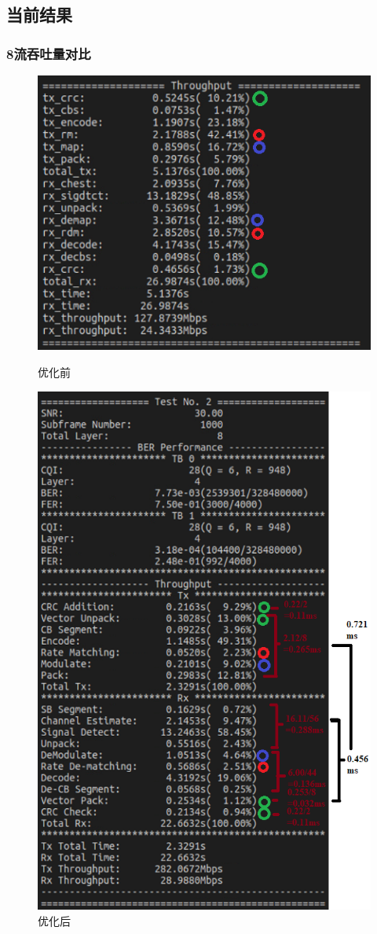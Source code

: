 \documentclass{article}
\begin{document}
\subsection{当前结果}
\subsubsection{8流吞吐量对比}
\begin{figure}[H]
	\centering
	\begin{minipage}[t]{0.4\textwidth}
		\centering
		\includegraphics[width = .8\textwidth]{old8.png}
		\caption{优化前}
	\end{minipage}
	\begin{minipage}[t]{0.4\textwidth}
		\centering
		\includegraphics[width = .8\textwidth]{now8.png}
		\caption{优化后}
	\end{minipage}
\end{figure}
\end{document}
